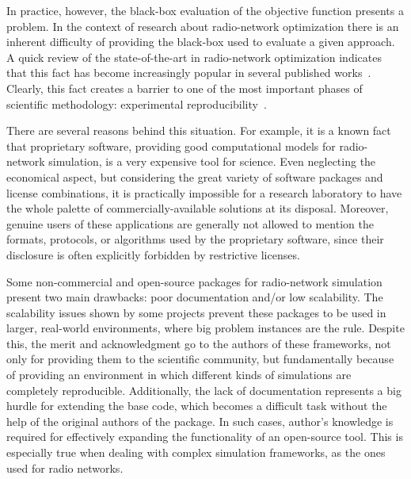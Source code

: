\bigskip{}


In practice, however, the black-box evaluation of the objective function
presents a problem. In the context of research about radio-network
optimization there is an inherent difficulty of providing the black-box
used to evaluate a given approach. A quick review of the state-of-the-art
in radio-network optimization indicates that this fact has become
increasingly popular in several published works~\cite{Amaldi-Radio_planning_and_coverage_optimization_of_3G_networks:2008,chen2008automated,Chen-Fast_algorithm_for_large_scale_UMTS_coverage_planning:2009,Antenna.azimuth.tilt:2009,Antenna.Configuration:2008,Siomina:Minimum.pilot.power.for.service.coverage}.
Clearly, this fact creates a barrier to one of the most important
phases of scientific methodology: experimental reproducibility~\cite{gauch2002scientific}. 

There are several reasons behind this situation. For example, it is
a known fact that proprietary software, providing good computational
models for radio-network simulation, is a very expensive tool for
science. Even neglecting the economical aspect, but considering the
great variety of software packages and license combinations, it is
practically impossible for a research laboratory to have the whole
palette of commercially-available solutions at its disposal. Moreover,
genuine users of these applications are generally not allowed to mention
the formats, protocols, or algorithms used by the proprietary software,
since their disclosure is often explicitly forbidden by restrictive
licenses.

Some non-commercial and open-source packages for radio-network simulation~\cite{Ozimek_Open.source.radio.coverage.prediction:2010,Momentum.project,Mehlfuhrer_The_Vienna_LTE_Simulators_enabling_reproducibility_in_wireless_communications_research:2011,Pillekeit-A_hybrid_simulation_framework_for_the_evaluation_of_common_RRM:2012,Piro_Simulating_LTE_cellular_systems_an_open_source_framework:2011,Yeung-Detailed_OFDM_modeling_in_network_simulation:2004}
present two main drawbacks: poor documentation and/or low scalability.
The scalability issues shown by some projects prevent these packages
to be used in larger, real-world environments, where big problem instances
are the rule. Despite this, the merit and acknowledgment go to the
authors of these frameworks, not only for providing them to the scientific
community, but fundamentally because of providing an environment in
which different kinds of simulations are completely reproducible.
Additionally, the lack of documentation represents a big hurdle for
extending the base code, which becomes a difficult task without the
help of the original authors of the package. In such cases, author's
knowledge is required for effectively expanding the functionality
of an open-source tool. This is especially true when dealing with
complex simulation frameworks, as the ones used for radio networks.


